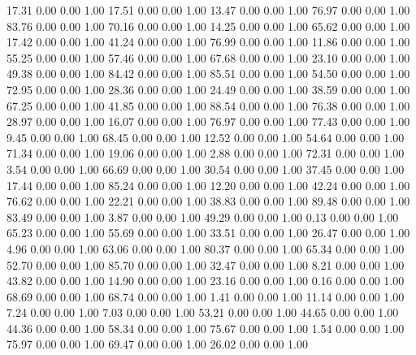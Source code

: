    17.31   0.00   0.00   1.00
   17.51   0.00   0.00   1.00
   13.47   0.00   0.00   1.00
   76.97   0.00   0.00   1.00
   83.76   0.00   0.00   1.00
   70.16   0.00   0.00   1.00
   14.25   0.00   0.00   1.00
   65.62   0.00   0.00   1.00
   17.42   0.00   0.00   1.00
   41.24   0.00   0.00   1.00
   76.99   0.00   0.00   1.00
   11.86   0.00   0.00   1.00
   55.25   0.00   0.00   1.00
   57.46   0.00   0.00   1.00
   67.68   0.00   0.00   1.00
   23.10   0.00   0.00   1.00
   49.38   0.00   0.00   1.00
   84.42   0.00   0.00   1.00
   85.51   0.00   0.00   1.00
   54.50   0.00   0.00   1.00
   72.95   0.00   0.00   1.00
   28.36   0.00   0.00   1.00
   24.49   0.00   0.00   1.00
   38.59   0.00   0.00   1.00
   67.25   0.00   0.00   1.00
   41.85   0.00   0.00   1.00
   88.54   0.00   0.00   1.00
   76.38   0.00   0.00   1.00
   28.97   0.00   0.00   1.00
   16.07   0.00   0.00   1.00
   76.97   0.00   0.00   1.00
   77.43   0.00   0.00   1.00
    9.45   0.00   0.00   1.00
   68.45   0.00   0.00   1.00
   12.52   0.00   0.00   1.00
   54.64   0.00   0.00   1.00
   71.34   0.00   0.00   1.00
   19.06   0.00   0.00   1.00
    2.88   0.00   0.00   1.00
   72.31   0.00   0.00   1.00
    3.54   0.00   0.00   1.00
   66.69   0.00   0.00   1.00
   30.54   0.00   0.00   1.00
   37.45   0.00   0.00   1.00
   17.44   0.00   0.00   1.00
   85.24   0.00   0.00   1.00
   12.20   0.00   0.00   1.00
   42.24   0.00   0.00   1.00
   76.62   0.00   0.00   1.00
   22.21   0.00   0.00   1.00
   38.83   0.00   0.00   1.00
   89.48   0.00   0.00   1.00
   83.49   0.00   0.00   1.00
    3.87   0.00   0.00   1.00
   49.29   0.00   0.00   1.00
    0.13   0.00   0.00   1.00
   65.23   0.00   0.00   1.00
   55.69   0.00   0.00   1.00
   33.51   0.00   0.00   1.00
   26.47   0.00   0.00   1.00
    4.96   0.00   0.00   1.00
   63.06   0.00   0.00   1.00
   80.37   0.00   0.00   1.00
   65.34   0.00   0.00   1.00
   52.70   0.00   0.00   1.00
   85.70   0.00   0.00   1.00
   32.47   0.00   0.00   1.00
    8.21   0.00   0.00   1.00
   43.82   0.00   0.00   1.00
   14.90   0.00   0.00   1.00
   23.16   0.00   0.00   1.00
    0.16   0.00   0.00   1.00
   68.69   0.00   0.00   1.00
   68.74   0.00   0.00   1.00
    1.41   0.00   0.00   1.00
   11.14   0.00   0.00   1.00
    7.24   0.00   0.00   1.00
    7.03   0.00   0.00   1.00
   53.21   0.00   0.00   1.00
   44.65   0.00   0.00   1.00
   44.36   0.00   0.00   1.00
   58.34   0.00   0.00   1.00
   75.67   0.00   0.00   1.00
    1.54   0.00   0.00   1.00
   75.97   0.00   0.00   1.00
   69.47   0.00   0.00   1.00
   26.02   0.00   0.00   1.00
